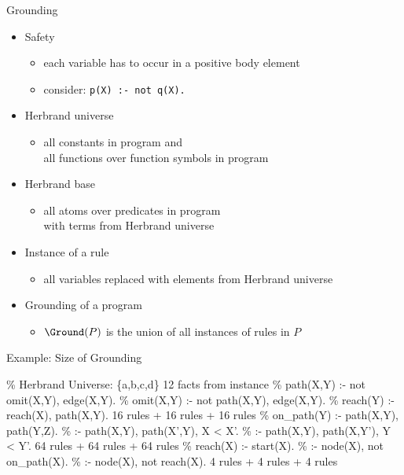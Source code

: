 \begin{frame}{Grounding}
  \begin{itemize}
    \item Safety
      \begin{itemize}
        \item each variable has to occur in a positive body element
        \item consider: \texttt{p(X) :- not q(X).}
      \end{itemize}
    \item Herbrand universe
      \begin{itemize}
        \item
          \alert{all constants} in program and\\
          \alert{all functions} over function symbols in program
      \end{itemize}
    \item Herbrand base
      \begin{itemize}
        \item \alert{all atoms} over predicates in program\\ with terms from Herbrand universe
      \end{itemize}
    \item Instance of a rule
      \begin{itemize}
        \item all variables replaced with elements from Herbrand universe
      \end{itemize}
    \item Grounding of a program
      \begin{itemize}
        \item \(\Ground(P)\) is the union of all instances of %
              rules in \(P\)
      \end{itemize}
  \end{itemize}
\end{frame}

\begin{frame}[fragile]{Example: Size of Grounding}
  \begin{SemiVerbatim}{.9}
{\color{comment}\% Herbrand Universe: \{a,b,c,d\}}
12 facts from instance
{\color{comment}\% path(X,Y) :- not omit(X,Y), edge(X,Y).}
{\color{comment}\% omit(X,Y) :- not path(X,Y), edge(X,Y).}
{\color{comment}\% reach(Y) :- reach(X), path(X,Y).}
16 rules + 16 rules + 16 rules
{\color{comment}\% on_path(Y) :- path(X,Y), path(Y,Z).}
{\color{comment}\% :- path(X,Y), path(X',Y), X < X'.}
{\color{comment}\% :- path(X,Y), path(X,Y'), Y < Y'.}
64 rules + 64 rules + 64 rules
{\color{comment}\% reach(X) :- start(X).}
{\color{comment}\% :- node(X), not on_path(X).}
{\color{comment}\% :- node(X), not reach(X).}
4 rules + 4 rules + 4 rules
  \end{SemiVerbatim}
\end{frame}

